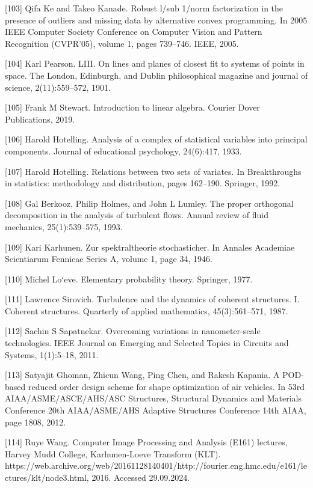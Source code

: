 \documentclass[preprint,12pt]{elsarticle}
\begin{document}
[103] Qifa Ke and Takeo Kanade. Robust l/sub 1/norm factorization in the presence of outliers and missing data by alternative convex programming. In 2005 IEEE Computer Society Conference on Computer Vision and Pattern Recognition (CVPR’05), volume 1, pages 739–746. IEEE, 2005. 

[104] Karl Pearson. LIII. On lines and planes of closest fit to systems of points in space. The London, Edinburgh, and Dublin philosophical magazine and journal of science, 2(11):559–572, 1901. 

[105] Frank M Stewart. Introduction to linear algebra. Courier Dover Publications, 2019. 

[106] Harold Hotelling. Analysis of a complex of statistical variables into principal components. Journal of educational psychology, 24(6):417, 1933. 

[107] Harold Hotelling. Relations between two sets of variates. In Breakthroughs in statistics: methodology and distribution, pages 162–190. Springer, 1992. 

[108] Gal Berkooz, Philip Holmes, and John L Lumley. The proper orthogonal decomposition in the analysis of turbulent flows. Annual review of fluid mechanics, 25(1):539–575, 1993. 

[109] Kari Karhunen. Zur spektraltheorie stochasticher. In Annales Academiae Scientiarum Fennicae Series A, volume 1, page 34, 1946. 

[110] Michel Lo`eve. Elementary probability theory. Springer, 1977. 

[111] Lawrence Sirovich. Turbulence and the dynamics of coherent structures. I. Coherent structures. Quarterly of applied mathematics, 45(3):561–571, 1987. 

[112] Sachin S Sapatnekar. Overcoming variations in nanometer-scale technologies. IEEE Journal on Emerging and Selected Topics in Circuits and Systems, 1(1):5–18, 2011. 

[113] Satyajit Ghoman, Zhicun Wang, Ping Chen, and Rakesh Kapania. A POD-based reduced order design scheme for shape optimization of air vehicles. In 53rd AIAA/ASME/ASCE/AHS/ASC Structures, Structural Dynamics and Materials Conference 20th AIAA/ASME/AHS Adaptive Structures Conference 14th AIAA, page 1808, 2012. 

[114] Ruye Wang. Computer Image Processing and Analysis (E161) lectures, Harvey Mudd College, Karhunen-Loeve Transform (KLT). https://web.archive.org/web/20161128140401/http://fourier.eng.hmc.edu/e161/lectures/klt/node3.html, 2016. Accessed 29.09.2024. 
\end{document}
